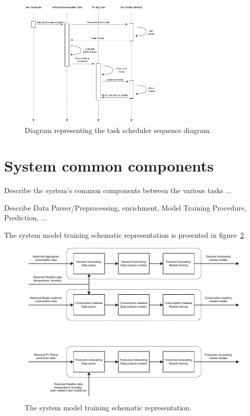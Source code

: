 \begin{figure}[H]
\centering 
\includegraphics[width=0.6\textwidth]{images/architecture_scheduler_sequence}
\caption{Diagram representing the task scheduler sequence diagram.}
\label{fig:schedulersequence}
\end{figure}


\section{System common components}
\label{sec:components}
\vspace{0.2 cm}

Describe the system's common components between the various tasks ...

Describe Data Parser/Preprocessing, enrichment, Model Training Procedure, Prediction, ...

The system model training schematic representation is presented in figure~\ref{fig:modeltraining}.

\begin{figure}[H]
\centering 
\includegraphics[width=1\textwidth]{images/system_model_training}
\caption{The system model training schematic representation.}
\label{fig:modeltraining}
\end{figure}

